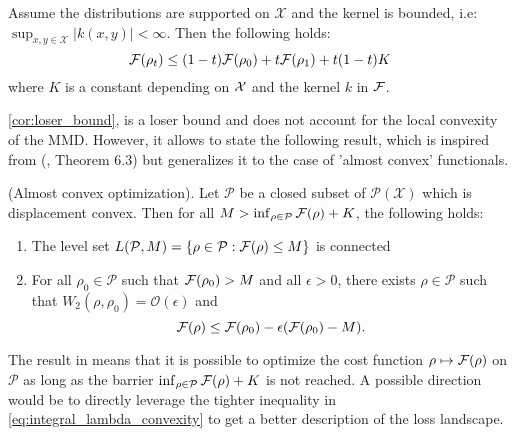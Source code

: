 \begin{corollary}
\label{cor:loser_bound}Assume the distributions are supported on
$\mathcal{X}$ and the kernel is bounded, i.e: $\sup_{x,y\in\mathcal{X}}\vert k(x,y)\vert<\infty$.
Then the following holds:
\begin{equation}
{{\mathcal F}}(\rho_{t})\leq(1-t){{\mathcal F}}(\rho_{0})+t{{\mathcal F}}(\rho_{1})+t(1-t)K
\end{equation}
where $K$ is a constant depending on ${{\mathcal X}}$ and the kernel $k$ in ${{\mathcal F}}$.
\end{corollary}
%
%
\cref{cor:loser_bound}, is a loser bound and does not account for the local
convexity of the MMD. However, it allows to state the following result,
which is inspired from (\cite{Bottou:2017}, Theorem 6.3) but generalizes
it to the case of 'almost convex' functionals.
\begin{proposition}
\label{prop:almost_convex_optimization}
(Almost convex optimization). Let $\mathcal{P}$ be a closed subset
of $\mathcal{P}(\mathcal{X})$ which is displacement convex. Then
for all $M>\inf_{\rho\in\mathcal{P}}{{\mathcal F}}(\rho)+K$, the following
holds:
\end{proposition}
\begin{enumerate}
\item The level set $L(\mathcal{P},M)=\{\rho\in\mathcal{P}:{{\mathcal F}}(\rho)\leq M\}$
is connected
\item For all $\rho_{0}\in\mathcal{P}$ such that ${{\mathcal F}}(\rho_0)>M$
and all $\epsilon>0$, there exists $\rho\in\mathcal{P}$ such that
$W_{2}(\rho,\rho_{0})=\mathcal{O}(\epsilon)$ and
\[
{{\mathcal F}}(\rho)\leq {{\mathcal F}}(\rho_{0})-\epsilon({{\mathcal F}}(\rho_{0})-M).
\]
\end{enumerate}
%
The result in  means that it is possible to optimize the cost function $\rho\mapsto {{\mathcal F}}(\rho)$
on $\mathcal{P}$ as long as the barrier $\inf_{\rho\in\mathcal{P}}{{\mathcal F}}(\rho)+K$
is not reached. A possible direction would be to directly leverage the tighter inequality in \cref{eq:integral_lambda_convexity} to get a better description of the loss landscape.%







